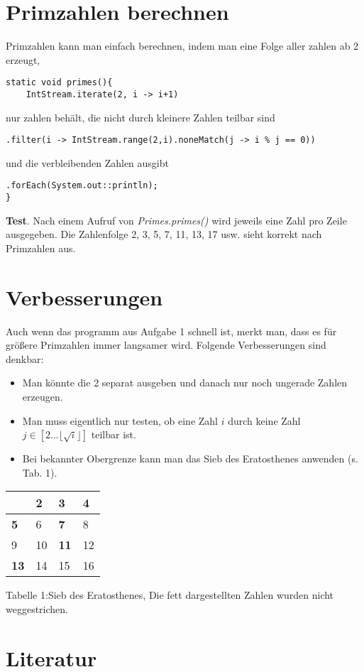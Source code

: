 \documentclass{pi1}
\begin{document}
\section{Primzahlen berechnen}
Primzahlen kann man einfach berechnen, indem man eine Folge aller zahlen ab 2 erzeugt,
\begin{lstlisting}[firstnumber=10]
static void primes(){
	IntStream.iterate(2, i -> i+1)
\end{lstlisting}
nur zahlen behält, die nicht durch kleinere Zahlen teilbar sind
\begin{lstlisting}[firstnumber=12]
	.filter(i -> IntStream.range(2,i).noneMatch(j -> i % j == 0))
\end{lstlisting}
und die verbleibenden Zahlen ausgibt
\begin{lstlisting}[firstnumber=14]
	.forEach(System.out::println);
}
\end{lstlisting}
\textbf{Test}. Nach einem Aufruf von \textit{Primes.primes()} wird jeweils eine Zahl pro Zeile ausgegeben. Die Zahlenfolge 2, 3, 5, 7, 11, 13, 17 usw. sieht korrekt nach Primzahlen aus.

\section{Verbesserungen}
Auch wenn das programm aus Aufgabe 1 schnell ist, merkt man, dass es für größere Primzahlen immer langsamer wird. Folgende Verbesserungen sind denkbar:
\begin{itemize}
\item Man könnte die 2 separat ausgeben und danach nur noch ungerade Zahlen erzeugen.
\item Man muss eigentlich nur testen, ob eine Zahl $i$ durch keine Zahl $j\in\left[ 2...\lfloor\sqrt{i}\rfloor\right]$ teilbar ist.
\item Bei bekannter Obergrenze kann man das Sieb des Eratosthenes \cite{mohring-oellrich-08} anwenden (s. Tab. 1).
\end{itemize}
\begin{center}
\begin{tabular}{|l|l|l|l|}
\hline
&\textbf{2}&\textbf{3}&4\\
\hline
\textbf{5}&6&\textbf{7}&8\\
\hline
9&10&\textbf{11}&12\\
\hline
\textbf{13}&14&15&16\\
\hline
\end{tabular}
\end{center}
Tabelle 1:Sieb des Eratosthenes, Die fett dargestellten Zahlen wurden nicht weggestrichen.

\section*{Literatur}


\end{document}
